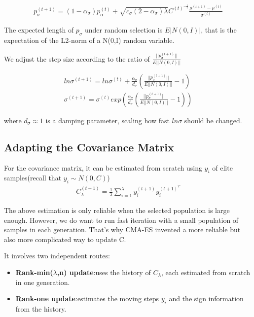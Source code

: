 \documentclass[12pt]{article}
\begin{document}
\begin{gather}
	p_\sigma^{(t+1)}=(1-\alpha_\sigma)p_\alpha^{(t)}+\sqrt{c_\sigma(2-\alpha_\sigma)\lambda}C^{(t)^{-\frac{1}{2}}}\frac{\mu^{(t+1)}-\mu^{(t)}}{\sigma^{(t)}}
\end{gather}

The expected length of $p_\sigma$ under random selection is $E|N(0,I)|$, 
that is the expectation of the L2-norm of a N(0,I) random variable.

We adjust the step size according to the ratio of $\frac{||p_\sigma^{(t+1)}||}{E||N(0,I)||}$

\begin{gather}
	ln \sigma^{(t+1)}=ln \sigma^{(t)}+\frac{\alpha_\sigma}{d_\sigma}(\frac{||p_\sigma^{(t+1)}||}{E||N(0,I)||}-1)\\
     \sigma^{(t+1)}= \sigma^{(t)} exp(\frac{\alpha_\sigma}{d_\sigma}(\frac{||p_\sigma^{(t+1)}||}{E||N(0,I)||}-1))
\end{gather}

where $d_\sigma \approx  1$ is a damping parameter, scaling how fast
$ln \sigma$  should be changed.

\subsection{Adapting the Covariance Matrix}

For the covariance matrix, it can be estimated from scratch using
$y_i$ of elite samples(recall that $y_i\sim N(0,C)$)
\begin{gather}
	C_\lambda^{(t+1)}=\frac{1}{\lambda}\sum_{i=1}^\lambda y_i^{(t+1)}y_i^{(t+1)^T}
\end{gather}

The above estimation is only reliable when the selected population is large enough. However, we do want to run fast iteration with a small population of samples in each generation. 
That's why CMA-ES invented a more reliable but also more complicated way 
to update C. 

It involves two independent routes:
\begin{itemize}
	\item \textbf{Rank-min($\lambda$,n) update}:uses the history of ${C_\lambda}$, each estimated from scratch in one generation.
	\item \textbf{Rank-one update}:estimates the moving 
	steps $y_i$ and the sign information from the history.
\end{itemize}
\end{document}

